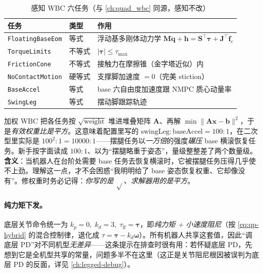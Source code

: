 \begin{table}[H]\centering\small
\caption{感知 WBC 六任务（与 \cref{ch:quad_wbc} 同源，感知不改）}
\begin{tabular}{p{} p{} p{}}
\toprule
任务 & 类型 & 作用 \\
\midrule
\texttt{FloatingBaseEom} & 等式 & 浮动基多刚体动力学 $\mathbf{M}\ddot{\mathbf{q}}+\mathbf{h}=\mathbf{S}^\top\boldsymbol{\tau}+\mathbf{J}^\top\mathbf{f}_c$ \\
\texttt{TorqueLimits} & 不等式 & $|\boldsymbol{\tau}|\le \tau_{\max}$ \\
\texttt{FrictionCone} & 不等式 & 接触力在摩擦锥（金字塔近似）内 \\
\texttt{NoContactMotion} & 硬等式 & 支撑脚加速度 $=0$（完美 stiction）\\
\texttt{BaseAccel} & 等式 & base 六自由度加速度跟 NMPC 质心动量率 \\
\texttt{SwingLeg} & 等式 & 摆动脚跟踪轨迹 \\
\bottomrule
\end{tabular}
\label{tab:lp-wbc}
\end{table}

\begin{pitfall}[加权 WBC 的权重进 $\mathbf{H}=\mathbf{A}^\top\mathbf{A}$ 是\emph{平方}的]\label{pit:lp-square-weight}
加权 WBC 把各任务按 $\sqrt{\text{weight}}$ 堆进堆叠矩阵 $\mathbf{A}$、再解 $\min\|\mathbf{A}\mathbf{x}-\mathbf{b}\|^2$，于是\emph{有效权重比是平方}。这意味着配置里写的 $\text{swingLeg}{:}\text{baseAccel}=100{:}1$，在二次型里实际是 $100^2{:}1=10000{:}1$——摆腿任务以\emph{一万倍}的强度\emph{碾压} base 横滚恢复任务。新手按字面读成 $100{:}1$、以为“摆腿略重于姿态”，量级整整差了两个数量级。\textbf{含义}：当机器人在台阶处需要 base 任务去恢复横滚时，它被摆腿任务压得几乎使不上劲。理解这一点，才不会困惑“我明明给了 base 姿态恢复权重、它却像没有”。修权重时务必记得：\emph{你写的是 $\sqrt{}$、求解器用的是平方}。
\end{pitfall}

\paragraph{纯力矩下发。}
底层关节命令统一为 $k_p=0,\;k_d=3,\;\tau_{\mathrm{ff}}=\boldsymbol{\tau}$，即\emph{纯力矩 + 小速度阻尼}（按 \cref{eq:qp-hybrid} 的混合控制律，退化成 $\tau=\boldsymbol{\tau}-k_d\boldsymbol{\omega}$）。所有机器人共享这套值，因此“调底层 PD”对不同机型\emph{无差异}——这条提示在排查时很有用：若怀疑底层 PD，先想到它是全机型共享的常量，问题多半不在这里（这正是关节阻尼根因被误判为底层 PD 的反面，详见 \cref{ch:legged-debug}）。

